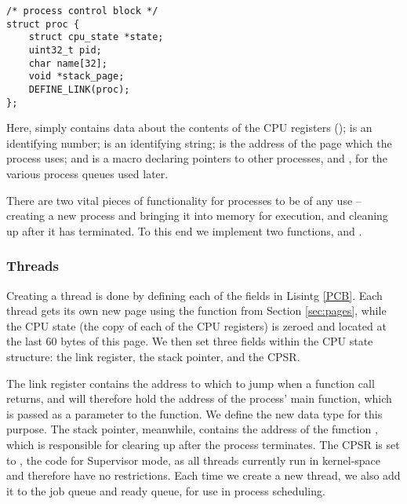         \lstset{language=c}
        \begin{lstlisting}[caption={A Process Control Block}, captionpos=b,
        label={lst:PCB}]
/* process control block */
struct proc {
    struct cpu_state *state;
    uint32_t pid;
    char name[32];
    void *stack_page;
    DEFINE_LINK(proc);
};
        \end{lstlisting}

        Here,  simply contains data about the contents of
        the CPU registers ();  is an identifying number;
         is an identifying string;  is the address of
        the page which the process uses; and  is a macro
        declaring pointers to other processes,  and , for the
        various process queues used later.

        There are two vital pieces of functionality for processes to be of any use
        -- creating a new process and bringing it into memory for execution, and
        cleaning up after it has terminated. To this end we implement two functions,
         and .

    \subsubsection{Threads}
        Creating a thread is done by defining each of the fields in Lisintg
        \ref{PCB}. Each thread gets its own new page using the
         function from Section \ref{sec:pages}, while the
        CPU state (the copy of each of the CPU registers) is zeroed and located
        at the last 60 bytes of this page. We then set three fields within the
        CPU state structure: the link register, the stack pointer, and the CPSR.

        The link register contains the address to which to jump when a function
        call returns, and will therefore hold the address of the process' main
        function, which is passed as a parameter to the function. We define the
        new data type  for this purpose. The stack pointer,
        meanwhile, contains the address of the function , which is
        responsible for clearing up after the process terminates. The CPSR is
        set to , the code for Supervisor mode, as all threads
        currently run in kernel-space and therefore have no restrictions. Each
        time we create a new thread, we also add it to the job queue and ready
        queue, for use in process scheduling.

